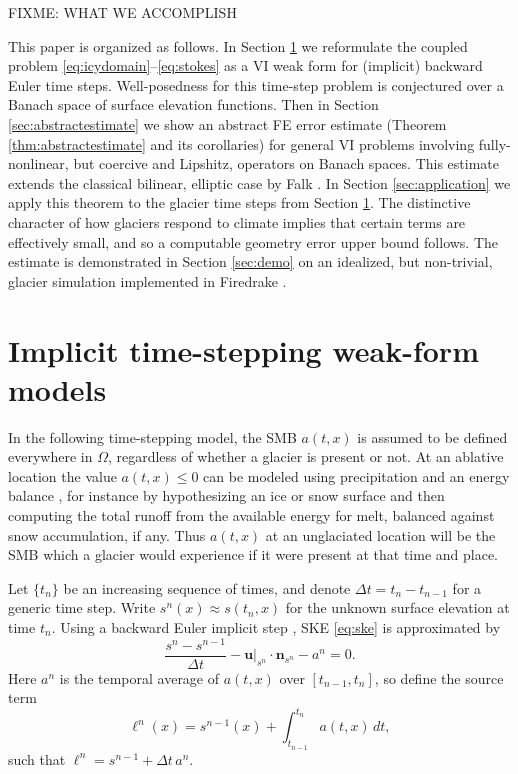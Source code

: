 \documentclass[hidelinks,onefignum,onetabnum,final]{siamart220329}  %
\newcommand{\bn}{\mathbf{n}}
\newcommand{\bu}{\mathbf{u}}
\begin{document}
FIXME: WHAT WE ACCOMPLISH

This paper is organized as follows.  In Section \ref{sec:models} we reformulate the coupled problem \eqref{eq:icydomain}--\eqref{eq:stokes} as a VI weak form for (implicit) backward Euler time steps.  Well-posedness for this time-step problem is conjectured over a Banach space of surface elevation functions.  Then in Section \ref{sec:abstractestimate} we show an abstract FE error estimate (Theorem \ref{thm:abstractestimate} and its corollaries) for general VI problems involving fully-nonlinear, but coercive and Lipshitz, operators on Banach spaces.  This estimate extends the classical bilinear, elliptic case by Falk \cite{Falk1974}.  In Section \ref{sec:application} we apply this theorem to the glacier time steps from Section \ref{sec:models}.  The distinctive character of how glaciers respond to climate implies that certain terms are effectively small, and so a computable geometry error upper bound follows.  The estimate is demonstrated in Section \ref{sec:demo} on an idealized, but non-trivial, glacier simulation implemented in Firedrake \cite{Hametal2023}.


\section{Implicit time-stepping weak-form models} \label{sec:models}

In the following time-stepping model, the SMB $a(t,x)$ is assumed to be defined everywhere in $\Omega$, regardless of whether a glacier is present or not.  At an ablative location the value $a(t,x)\le 0$ can be modeled using precipitation and an energy balance \cite{GreveBlatter2009}, for instance by hypothesizing an ice or snow surface and then computing the total runoff from the available energy for melt, balanced against snow accumulation, if any.  Thus $a(t,x)$ at an unglaciated location will be the SMB which a glacier would experience if it were present at that time and place.

Let $\{t_n\}$ be an increasing sequence of times, and denote $\Delta t = t_n-t_{n-1}$ for a generic time step.  Write $s^n(x)\approx s(t_n,x)$ for the unknown surface elevation at time $t_n$.  Using a backward Euler implicit step \cite{AscherPetzold1998}, SKE \eqref{eq:ske} is approximated by
\begin{equation}
\frac{s^n - s^{n-1}}{\Delta t} - \bu|_{s^n} \cdot \bn_{s^n} - a^n = 0. \label{eq:be:ske}
\end{equation}
Here $a^n$ is the temporal average of $a(t,x)$ over $[t_{n-1},t_n]$, so define the source term
\begin{equation}
\ell^n(x) = s^{n-1}(x) + \int_{t_{n-1}}^{t_n} a(t,x)\,dt, \label{eq:be:source}
\end{equation}
such that $\ell^n=s^{n-1}+\Delta t\,a^n$.
\end{document}
